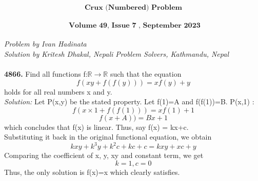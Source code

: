 \documentclass[12pt]{article}
\begin{document}
\[ \textbf{Crux (Numbered) Problem}\] \\
\[\textbf{ Volume 49, Issue 7 , September 2023} \] \\
\textit{Problem by Ivan Hadinata} \\
\textit{Solution by Kritesh Dhakal, Nepali Problem Solvers, Kathmandu, Nepal} \\ \\
\textbf{4866.} Find all functions f:$\mathbb{R}\rightarrow\mathbb{R}$ such that the equation
\[ f(xy+f(f(y)))=xf(y)+y \] holds for all real numbers x and y. \\
										\]
\textit{Solution:}
Let P(x,y) be the stated property.
Let f(1)=A and f(f(1))=B. 
P(x,1) : \[ f(x\times 1+f(f(1)))=xf(1)+1 \]
\[ f(x+A))=Bx+1 \]
which concludes that f(x) is linear. Thus, say f(x) = kx+c.  \\
Substituting it back in the original functional equation, we obtain \\
\[kxy+k^3y+k^2c+kc+c = kxy+xc+y \]
Comparing the coefficient of x, y, xy and constant term, we get \\
\[k=1,  c=0 \]
Thus, the only solution is f(x)=x which clearly satisfies.
\end{document}
